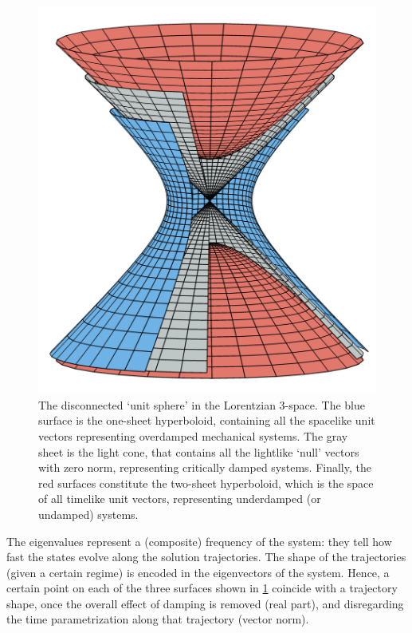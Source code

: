 \begin{figure}[ht!]
    \centering
    \includegraphics[]{media/other/lorentz_space.png}
    \caption{The disconnected `unit sphere' in the Lorentzian 3-space. The blue surface is the one-sheet hyperboloid, containing all the spacelike unit vectors representing overdamped mechanical systems. The gray sheet is the light cone, that contains all the lightlike `null' vectors with zero norm, representing critically damped systems. Finally, the red surfaces constitute the two-sheet hyperboloid, which is the space of all timelike unit vectors, representing underdamped (or undamped) systems.}
    \label{fig:hyperboloids}
\end{figure}

The eigenvalues represent a (composite) frequency of the system: they tell how fast the states evolve along the solution trajectories. The shape of the trajectories (given a certain regime) is encoded in the eigenvectors of the system. Hence, a certain point on each of the three surfaces shown in \cref{fig:hyperboloids} coincide with a trajectory shape, once the overall effect of damping is removed (real part), and disregarding the time parametrization along that trajectory (vector norm).

